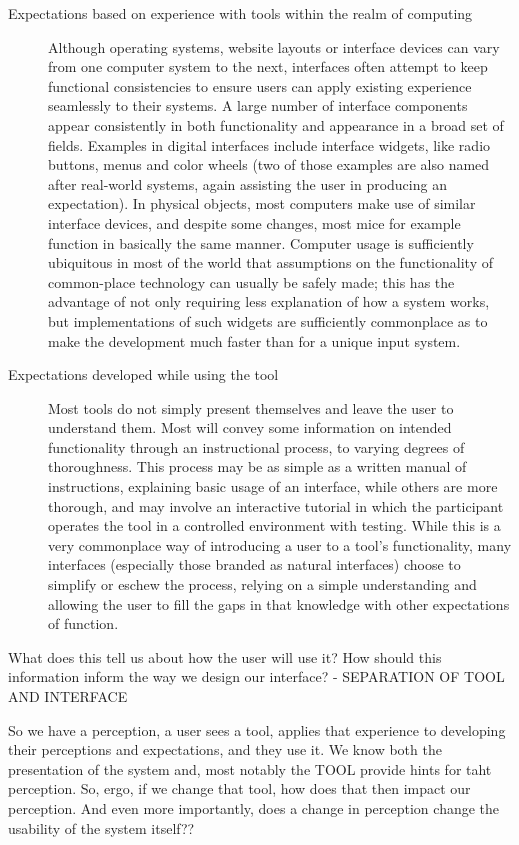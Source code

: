\begin{description}
\item [Expectations based on experience with tools within the realm of computing] Although operating systems, website layouts or interface devices can vary from one computer system to the next, interfaces often attempt to keep functional consistencies to ensure users can apply existing experience seamlessly to their systems. A large number of interface components appear consistently in both functionality and appearance in a broad set of fields. Examples in digital interfaces include interface widgets, like radio buttons, menus and color wheels (two of those examples are also named after real-world systems, again assisting the user in producing an expectation). In physical objects, most computers make use of similar interface devices, and despite some changes, most mice for example function in basically the same manner. Computer usage is sufficiently ubiquitous in most of the world that assumptions on the functionality of common-place technology can usually be safely made; this has the advantage of not only requiring less explanation of how a system works, but implementations of such widgets are sufficiently commonplace as to make the development much faster than for a unique input system.

\item [Expectations developed while using the tool] Most tools do not simply present themselves and leave the user to understand them. Most will convey some information on intended functionality through an instructional process, to varying degrees of thoroughness. This process may be as simple as a written manual of instructions, explaining basic usage of an interface, while others are more thorough, and may involve an interactive tutorial in which the participant operates the tool in a controlled environment with testing. While this is a very commonplace way of introducing a user to a tool's functionality, many interfaces (especially those branded as natural interfaces) choose to simplify or eschew the process, relying on a simple understanding and allowing the user to fill the gaps in that knowledge with other expectations of function.

\end{description}

\begin{todoenv}
What does this tell us about how the user will use it?
How should this information inform the way we design our interface?
- SEPARATION OF TOOL AND INTERFACE

So we have a perception, a user sees a tool, applies that experience to developing their perceptions and expectations, and they use it.
We know both the presentation of the system and, most notably the TOOL provide hints for taht perception. So, ergo, if we change that tool, how does that then impact our perception. And even more importantly, does a change in perception change the usability of the system itself??

\end{todoenv}

